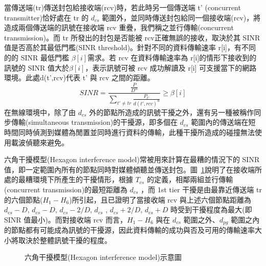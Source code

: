 \documentclass[12pt,a4paper]{article}
\newcommand{\Fig}[1]{圖~\ref{#1}}
\begin{document}
\begin{description}
\begin{enumerate}
當傳送端(tr)傳送封包給接收端(rcv)時，若此時另一個傳送端 t' (concurrent transmitter)恰好處在 tr 的 $d_{cs}$ 範圍外，並同時傳送封包給同一個接收端(rcv)，將造成兩個傳送端的訊號在接收端 rcv 重疊，我們稱之並行傳輸(concurrent transmission)。而 tr 所發出的封包是否能被 rcv正確無誤的接收，取決於其 SINR 值是否高於其最低門檻(SINR threshold)。針對不同的資料傳輸速率 r[i]，有不同的的 SINR 最低門檻 $\beta[i]$需求。若 rcv 在資料傳輸速率為 r[i]的情形下接收到的訊號的 SINR 值大於$\beta[i]$，表示訊號可被 rcv 成功解讀及 r[i] 可支援當下的網路環境。此處d(t',rcv)代表 t' 與 rcv 之間的距離。 
$$
SINR =  \frac{\frac{P}{D^ \alpha}}{ \sum_{t' \neq tr} \frac{P_{t'}}{d(t',rcv)^ \alpha} } \geq \beta[i]
$$
在無線環境中，除了由 $d_{cs}$ 外的節點所造成的訊號干擾之外，還有另一種被稱作同步傳輸(simultaneous transmission)的干擾源，即多個在 $d_{cs}$ 範圍內的傳送端在短時間同時偵測到媒體為閒置並同時進行資料的傳輸，此種干擾所造成的碰撞無法使用載波偵聽來避免。 

六角干擾模型(Hexagon interference model)常被用來計算在最糟的情況下的 SINR 值，即一定範圍內所有的節點同時對媒體傾聽並傳送封包。\Fig{fig:hexagon_model}說明了在接收端所處的最糟環境下所產生的干擾情形，根據 $T_{cs}$ 的定義，相鄰兩組並行傳輸(concurrent transmission)的最短距離為 $d_{cs}$ ，而 1st tier 干擾是由最靠近傳送端 tr 的六個節點($H_1 - H_6$)所引起，且\cite{tvt1986_cmrs}已證明了當接收端 rcv 與上述六個節點距離為 $d_{cs}-D$, $d_{cs}-D$, $d_{cs}-2/D$, $d_{cs}$ , $d_{cs}+2/D$, $d_{cs}+D$ 時受到干擾程度為最大(即 SINR 值最小)。而對接收端 rcv 而言，$H_1 - H_6$ 與在 $d_{cs}$ 範圍之外、$d_{pg}$ 範圍之內的節點都有可能成為訊號的干擾源，因此資料傳輸的成功與否及可用的傳輸速率大小將取決於整體訊號干擾的程度。

\begin{figure}[hbt]
\begin{center}
\caption{六角干擾模型(Hexagon interference model)示意圖} \label{fig:hexagon_model}
\vspace{-0.2cm}
\end{center}
\end{figure}


\end{enumerate}
\end{description}
\end{document}
